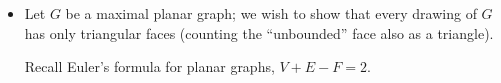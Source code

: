 \begin{itemize}

  \item Let \(G\) be a maximal planar graph; we wish to show that every drawing of \(G\) has only triangular faces (counting the ``unbounded'' face also as a triangle).

    Recall Euler's formula for planar graphs, \(V+E-F=2\).

\end{itemize}
